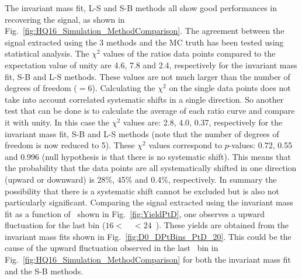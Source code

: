 The invariant mass fit, L-S and S-B methods all show good performances in recovering the signal, as shown in Fig.~\ref{fig:HQ16_Simulation_MethodComparison}.
The agreement between the signal extracted using the 3 methods and the MC truth has been tested using statistical analysis. The $\chi^2$ values
of the ratios data points compared to the expectation value of unity are 4.6, 7.8 and 2.4, respectively for the invariant mass fit, S-B and L-S methods.
These values are not much larger than the number of degrees of freedom ($=6$).
Calculating the $\chi^2$ on the single data points does not take into account correlated systematic shifts in a single direction. So another test that can be
done is to calculate the average of each ratio curve and compare it with unity. In this case the $\chi^2$ values are: 2.8, 4.0, 0.37, respectively for the invariant mass fit,
S-B and L-S methods (note that the number of degrees of freedom is now reduced to 5). These $\chi^2$ values correspond to $p$-values: 0.72, 0.55 and 0.996 (null hypothesis is
that there is no systematic shift).
This means that the probability that the data points are all systematically shifted in one direction (upward or downward) is 28\%, 45\% and 0.4\%, respectively.
In summary the possibility that there is a systematic shift cannot be excluded but is also not particularly significant. Comparing the signal extracted using the invariant mass fit
as a function of \ptd\, shown in Fig.~\ref{fig:YieldPtD}, one observes a upward fluctuation for the last bin ($16 < $~\ptd~$<24$~\GeVc). These yields are obtained from the invariant mass fits
shown in Fig.~\ref{fig:D0_DPtBins_PtD_20}. This could be the cause of the upward fluctuation observed in the last \ptchjet\ bin
in Fig.~\ref{fig:HQ16_Simulation_MethodComparison} for both the invariant mass fit and the S-B methods.
